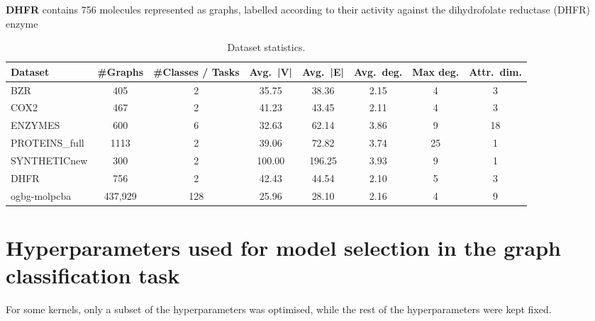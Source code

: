 \textbf{DHFR}
contains 756 molecules represented as graphs, labelled according to their activity against the dihydrofolate reductase (DHFR) enzyme \cite{sutherland2003spline}

\begin{table}[h]
\centering
\caption{Dataset statistics.}
\label{tab:dataset_stats}
\scriptsize
\setlength{\tabcolsep}{4.2pt}
\begin{adjustbox}{max width=\linewidth}
\begin{tabular}{lccccccc}
\toprule
\textbf{Dataset} & \#Graphs & \#Classes / Tasks & Avg.\ |V| & Avg.\ |E| & Avg.\ deg. & Max deg. & Attr.\ dim. \\
\midrule
BZR            & 405     & 2   & 35.75 & 38.36 & 2.15 & 4  & 3  \\
COX2           & 467     & 2   & 41.23 & 43.45 & 2.11 & 4  & 3  \\
ENZYMES        & 600     & 6   & 32.63 & 62.14 & 3.86 & 9  & 18 \\
PROTEINS\_full & 1113    & 2   & 39.06 & 72.82 & 3.74 & 25 & 1  \\
SYNTHETICnew   & 300     & 2   & 100.00& 196.25& 3.93 & 9  & 1  \\
DHFR           & 756     & 2   & 42.43 & 44.54 & 2.10 & 5  & 3  \\
ogbg-molpcba   & 437{,}929 & 128 & 25.96 & 28.10 & 2.16 & 4  & 9  \\
\bottomrule
\end{tabular}
\end{adjustbox}
\end{table}


\section{Hyperparameters used for model selection in the graph classification task}
\label{appendix:hyperparameters}

For some kernels, only a subset of the hyperparameters
was optimised, while the rest of the hyperparameters were kept fixed.

